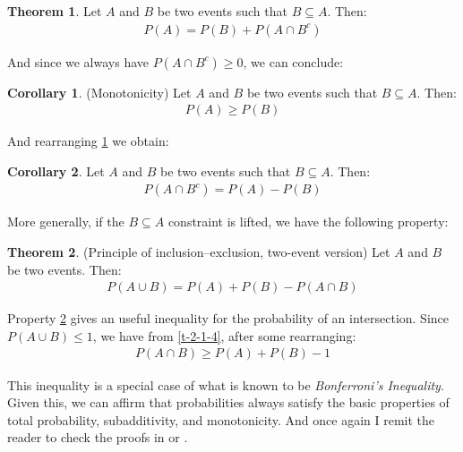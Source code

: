 \documentclass[
  oneside,
  11pt, a4paper,
  footinclude=true,
  headinclude=true,
  cleardoublepage=empty
]{scrbook}
\theoremstyle{definition}
\theoremstyle{definition}
\newtheorem{theorem}{Theorem}[section]
\newtheorem{corollary}{Corollary}[theorem]
\begin{document}
            \begin{theorem}{Let $A$ and $B$ be two events such that $B \subseteq A$. Then:}\label{2-1-3}
                \begin{align*}
                    P(A) = P(B) + P(A \cap B^c)
                \end{align*}{}
            \end{theorem}
            
            And since we always have $P(A \cap B^c) \geq 0$, we can conclude:
            \begin{corollary}{(Monotonicity) Let $A$ and $B$ be two events such that $B \subseteq A$. Then:}
                \begin{align*}
                    P(A) \geq P(B)
                \end{align*}{}
            \end{corollary}
            
            And rearranging \ref{2-1-3} we obtain:
            \begin{corollary}{Let $A$ and $B$ be two events such that $B \subseteq A$. Then:}
                \begin{align*}
                    P(A \cap B^c) = P(A) - P(B)
                \end{align*}{}
            \end{corollary}
            
            More generally, if the $B \subseteq A$ constraint is lifted, we have the following property:
            \begin{theorem}{(Principle of inclusion–exclusion, two-event version) Let $A$ and $B$ be two events. Then:}\label{2-1-4}
                \begin{align}\label{t-2-1-4}
                    P(A \cup B) = P(A) + P(B) - P(A \cap B)
                \end{align}{}
            \end{theorem}
            
            Property \ref{2-1-4} gives an useful inequality for the probability of an intersection. Since $P(A \cup B) \leq 1$, we have from \ref{t-2-1-4}, after some rearranging:
            \begin{align}\label{al-6}
                P(A \cap B) \geq P(A) + P(B) - 1
            \end{align}{}
            
            This inequality is a special case of what is known to be \emph{Bonferroni's Inequality}.
            Given this, we can affirm that probabilities always satisfy the basic properties of total probability, subadditivity, and monotonicity. And once again I remit the reader to check the proofs in \cite{CaseBerg:01} or \cite{RePEc:bes:amstat:v:59:y:2005:m:august:p:276-276}.
            
\end{document}
